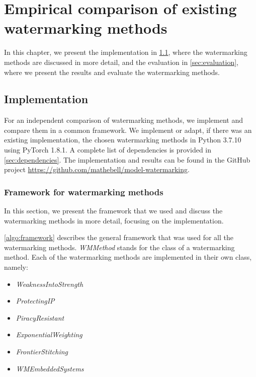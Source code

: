 \chapter{Empirical comparison of existing watermarking methods} \label{ch:empirical_comparison}
In this chapter, we present the implementation in \cref{sec:implementation}, where the watermarking methods are discussed in more detail, and the evaluation in \cref{sec:evaluation}, where we present the results and evaluate the watermarking methods.

\section{Implementation} \label{sec:implementation}
For an independent comparison of watermarking methods, we implement and compare them in a common framework. We implement or adapt, if there was an existing implementation, the chosen watermarking methods in Python 3.7.10 using PyTorch 1.8.1. A complete list of dependencies is provided in \cref{sec:dependencies}. The implementation and results can be found in the GitHub project \url{https://github.com/mathebell/model-watermarking}.


\subsection{Framework for watermarking methods}
In this section, we present the framework that we used and discuss the watermarking methods in more detail, focusing on the implementation.



\cref{algo:framework} describes the general framework that was used for all the watermarking methods. \textit{WMMethod} stands for the class of a watermarking method. Each of the watermarking methods are implemented in their own class, namely:
\begin{itemize}
    \item \textit{WeaknessIntoStrength} \cite{adi_turning_2018}
    \item \textit{ProtectingIP} \cite{zhang_protecting_2018}
    \item \textit{PiracyResistant} \cite{li_piracy_2020}
    \item \textit{ExponentialWeighting} \cite{namba_robust_2019}
    \item \textit{FrontierStitching} \cite{merrer_adversarial_2019}
    \item \textit{WMEmbeddedSystems} \cite{guo_watermarking_2018}
\end{itemize}

